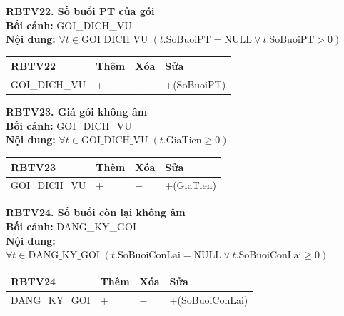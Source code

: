 \documentclass[11pt, a4paper]{article}
\begin{document}
\vspace{0.8em}
\textbf{RBTV22. Số buổi PT của gói} \\
\textbf{Bối cảnh:} GOI\_DICH\_VU \\
\textbf{Nội dung:} $\forall t \in \text{GOI\_DICH\_VU} \; (t.\text{SoBuoiPT} = \text{NULL} \lor t.\text{SoBuoiPT} > 0)$

\vspace{0.3em}
\begin{small}
\begin{tabularx}{\textwidth}{| C{4.2cm} | C{2cm} | C{2cm} | Y |}
\hline
\textbf{RBTV22} & \textbf{Thêm} & \textbf{Xóa} & \textbf{Sửa} \\
\hline
GOI\_DICH\_VU & + & $-$ & +(SoBuoiPT) \\
\hline
\end{tabularx}
\end{small}

\vspace{0.8em}
\textbf{RBTV23. Giá gói không âm} \\
\textbf{Bối cảnh:} GOI\_DICH\_VU \\
\textbf{Nội dung:} $\forall t \in \text{GOI\_DICH\_VU} \; (t.\text{GiaTien} \ge 0)$

\vspace{0.3em}
\begin{small}
\begin{tabularx}{\textwidth}{| C{4.2cm} | C{2cm} | C{2cm} | Y |}
\hline
\textbf{RBTV23} & \textbf{Thêm} & \textbf{Xóa} & \textbf{Sửa} \\
\hline
GOI\_DICH\_VU & + & $-$ & +(GiaTien) \\
\hline
\end{tabularx}
\end{small}

\vspace{0.8em}
\textbf{RBTV24. Số buổi còn lại không âm} \\
\textbf{Bối cảnh:} DANG\_KY\_GOI \\
\textbf{Nội dung:} $\forall t \in \text{DANG\_KY\_GOI} \; (t.\text{SoBuoiConLai} = \text{NULL} \lor t.\text{SoBuoiConLai} \ge 0)$

\vspace{0.3em}
\begin{small}
\begin{tabularx}{\textwidth}{| C{4.2cm} | C{2cm} | C{2cm} | Y |}
\hline
\textbf{RBTV24} & \textbf{Thêm} & \textbf{Xóa} & \textbf{Sửa} \\
\hline
DANG\_KY\_GOI & + & $-$ & +(SoBuoiConLai) \\
\hline
\end{tabularx}
\end{small}
\end{document}
